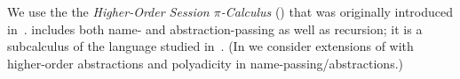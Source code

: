 \noindent 
We use the the 
\emph{Higher-Order Session $\pi$-Calculus} (\HOp)
that was originally introduced in~\cite{characteristic_bis}.
\HOp includes both name- and abstraction-passing 
as well as recursion; it is a subcalculus 
of the language
studied 
in~\cite{tlca07}. 
(In  we consider extensions of 
\HOp with higher-order abstractions 
and polyadicity in name-passing/abstractions.)


